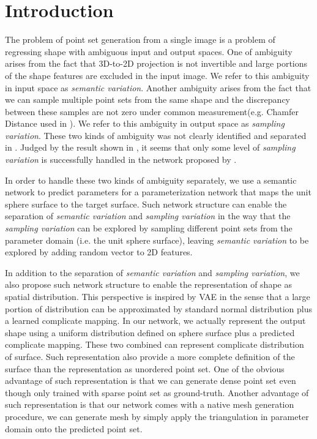 \section{Introduction}
The problem of point set generation from a single image is a problem of regressing shape with ambiguous input and output spaces. One of ambiguity arises from the fact that 3D-to-2D projection is not invertible and large portions of the shape features are excluded in the input image. We refer to this ambiguity in input space as \textit{semantic variation}. Another ambiguity arises from the fact that we can sample multiple point sets from the same shape and the discrepancy between these samples are not zero under common measurement(e.g. Chamfer Distance used in \cite{PSGN}). We refer to this ambiguity in output space as \textit{sampling variation}. These two kinds of ambiguity was not clearly identified and separated in \cite{PSGN}. Judged by the result shown in \cite{PSGN}, it seems that only some level of \textit{sampling variation} is successfully handled in the network proposed by \cite{PSGN}.

In order to handle these two kinds of ambiguity separately, we use a semantic network to predict parameters for a parameterization network that maps the unit sphere surface to the target surface. Such network structure can enable the separation of \textit{semantic variation} and \textit{sampling variation} in the way that the \textit{sampling variation} can be explored by sampling different point sets from the parameter domain (i.e. the unit sphere surface), leaving \textit{semantic variation} to be explored by adding random vector to 2D features.

In addition to the separation of \textit{semantic variation} and \textit{sampling variation}, we also propose such network structure to enable the representation of shape as spatial distribution. This perspective is inspired by VAE\cite{VAE} in the sense that a large portion of distribution can be approximated by standard normal distribution plus a learned complicate mapping. In our network, we actually represent the output shape using a uniform distribution defined on sphere surface plus a predicted complicate mapping. These two combined can represent complicate distribution of surface. Such representation also provide a more complete definition of the surface than the representation as unordered point set. One of the obvious advantage of such representation is that we can generate dense point set even though only trained with sparse point set as ground-truth. Another advantage of such representation is that our network comes with a native mesh generation procedure, we can generate mesh by simply apply the triangulation in parameter domain onto the predicted point set.

